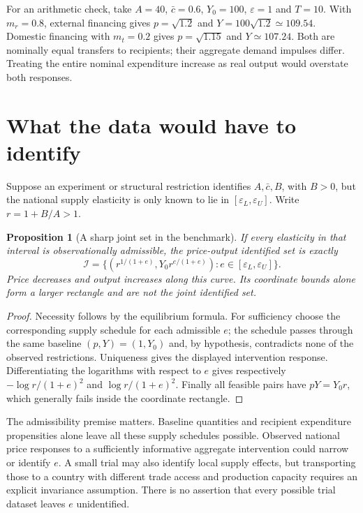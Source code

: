 \documentclass[11pt]{article}
\newtheorem{proposition}{Proposition}
\begin{document}
For an arithmetic check, take $A=40$, $\bar c=0.6$, $Y_0=100$, $\varepsilon=1$ and $T=10$. With $m_r=0.8$, external financing gives $p=\sqrt{1.2}$ and $Y=100\sqrt{1.2}\simeq109.54$. Domestic financing with $m_t=0.2$ gives $p=\sqrt{1.15}$ and $Y\simeq107.24$. Both are nominally equal transfers to recipients; their aggregate demand impulses differ. Treating the entire nominal expenditure increase as real output would overstate both responses.

\section*{What the data would have to identify}
Suppose an experiment or structural restriction identifies $A,\bar c,B$, with $B>0$, but the national supply elasticity is only known to lie in $[\varepsilon_L,\varepsilon_U]$. Write $r=1+B/A>1$.
\begin{proposition}[A sharp joint set in the benchmark]
If every elasticity in that interval is observationally admissible, the price-output identified set is exactly
\[
 \mathcal I=\{(r^{1/(1+e)},Y_0r^{e/(1+e)}):
 e\in[\varepsilon_L,\varepsilon_U]\}.
\]
Price decreases and output increases along this curve. Its coordinate bounds alone form a larger rectangle and are not the joint identified set.
\end{proposition}
\begin{proof}
Necessity follows by the equilibrium formula. For sufficiency choose the corresponding supply schedule for each admissible $e$; the schedule passes through the same baseline $(p,Y)=(1,Y_0)$ and, by hypothesis, contradicts none of the observed restrictions. Uniqueness gives the displayed intervention response. Differentiating the logarithms with respect to $e$ gives respectively $-\log r/(1+e)^2$ and $\log r/(1+e)^2$. Finally all feasible pairs have $pY=Y_0r$, which generally fails inside the coordinate rectangle.
\end{proof}

The admissibility premise matters. Baseline quantities and recipient expenditure propensities alone leave all these supply schedules possible. Observed national price responses to a sufficiently informative aggregate intervention could narrow or identify $e$. A small trial may also identify local supply effects, but transporting those to a country with different trade access and production capacity requires an explicit invariance assumption. There is no assertion that every possible trial dataset leaves $e$ unidentified.
\end{document}
